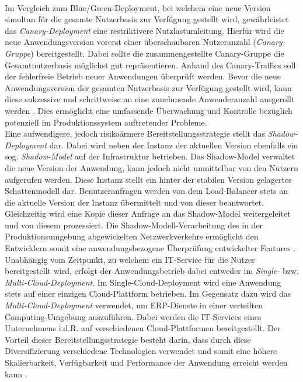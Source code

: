 \\Im Vergleich zum Blue/Green-Deployment, bei welchem eine neue Version simultan für die gesamte Nutzerbasis zur Verfügung gestellt wird, gewährleistet das \textit{Canary-Deployment} eine restriktivere Nutzlastumleitung. Hierfür wird die neue Anwendungsversion vorerst einer überschaubaren Nutzeranzahl (\textit{Canary-Gruppe}) bereitgestellt. Dabei sollte die zusammengestellte Canary-Gruppe die Gesamtnutzerbasis möglichst gut repräsentieren. Anhand des Canary-Traffics soll der fehlerfreie Betrieb neuer Anwendungen überprüft werden. Bevor die neue Anwendungsversion der gesamten Nutzerbasis zur Verfügung gestellt wird, kann diese sukzessive und schrittweise an eine zunehmende Anwenderanzahl ausgerollt werden \cite{Ugochi.20220503}. Dies ermöglicht eine umfassende Überwachung und Kontrolle bezüglich potenziell im Produktionssystem auftretender Probleme.\\ Eine aufwendigere, jedoch risikoärmere Bereitstellungsstrategie stellt das \textit{Shadow-Deployment} dar. Dabei wird neben der Instanz der aktuellen Version ebenfalls ein sog. \textit{Shadow-Model} auf der Infrastruktur betrieben. Das Shadow-Model verwaltet die neue Version der Anwendung, kann jedoch nicht unmittelbar von den Nutzern aufgerufen werden. Diese Instanz stellt ein hinter der stabilen Version gelagertes Schattenmodell dar. Benutzeranfragen werden von dem Load-Balancer stets an die aktuelle Version der Instanz übermittelt und von dieser beantwortet. Gleichzeitig wird eine Kopie dieser Anfrage an das Shadow-Model weitergeleitet und von diesem prozessiert. Die Shadow-Modell-Verarbeitung des in der Produktionsumgebung abgewickelten Netzwerkverkehrs ermöglicht den Entwicklern somit eine anwendungsbezogene Überprüfung entwickelter Features \cite{Ugochi.20220503}.\\ Unabhängig vom Zeitpunkt, zu welchem ein IT-Service für die Nutzer bereitgestellt 
  wird, erfolgt der Anwendungsbetrieb dabei entweder im \textit{Single-} bzw. \textit{Multi-Cloud-Deployment}. Im Single-Cloud-Deployment wird eine Anwendung stets auf einer einzigen Cloud-Plattform betrieben. Im Gegensatz dazu wird das \textit{Multi-Cloud-Deployment} verwendet, um ERP-Dienste in einer verteilten Computing-Umgebung auszuführen. Dabei werden die IT-Services eines Unternehmens i.d.R. auf verschiedenen Cloud-Plattformen bereitgestellt. Der Vorteil dieser Bereitstellungsstrategie besteht darin, dass durch diese Diversifizierung verschiedene Technologien verwendet und somit eine höhere Skalierbarkeit, Verfügbarkeit und Performance der Anwendung erreicht werden kann \cite{.20230419b}.